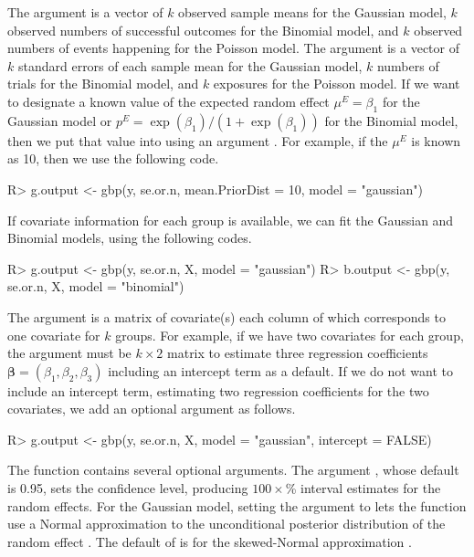 \documentclass[article]{jss}
\begin{document}
The argument  is a vector of $k$ observed sample means  for the Gaussian model, $k$ observed numbers of successful outcomes for the Binomial model, and $k$ observed numbers of events happening for the Poisson model. The argument   is a vector of $k$ standard errors of each sample mean for the Gaussian model, $k$ numbers of trials for the Binomial model, and $k$ exposures for the Poisson model. If we want to designate a known value of the expected random effect $\mu^E=\beta_1$ for the Gaussian model or $p^E=\exp(\beta_1)/(1+\exp(\beta_1))$ for the Binomial model, then we put that value into  using an argument . For example, if the $\mu^E$ is known as 10, then we use the following code. %
\begin{CodeChunk}
\begin{CodeInput}
R> g.output <- gbp(y, se.or.n, mean.PriorDist = 10, model = "gaussian")
\end{CodeInput}
\end{CodeChunk}

If covariate information for each group is available, we can fit the Gaussian and Binomial models, using the following codes.
\begin{CodeChunk}
\begin{CodeInput}
R> g.output <- gbp(y, se.or.n, X, model = "gaussian")
R> b.output <- gbp(y, se.or.n, X, model = "binomial")
\end{CodeInput}
\end{CodeChunk}

The argument  is a matrix of covariate(s) each column of which corresponds to one covariate for $k$ groups. For example, if we have two covariates for each group, the argument  must be $k\times2$ matrix to estimate three regression coefficients $\boldsymbol{\beta}=(\beta_1, \beta_2, \beta_3)$ including an intercept term as a default. If we do not want to include an intercept term, estimating two regression coefficients for the two covariates, we add an optional argument  as follows.
\begin{CodeChunk}
\begin{CodeInput}
R> g.output <- gbp(y, se.or.n, X, model = "gaussian", intercept = FALSE)
\end{CodeInput}
\end{CodeChunk}

The function  contains several optional arguments. The argument , whose default is 0.95, sets the confidence level, producing $100\times$\% interval estimates for the random effects. For the Gaussian model, setting the argument  to  lets the function   use a Normal approximation to the unconditional posterior distribution of the random effect \citep{tang2011}. The default of  is  for the skewed-Normal approximation \citep{kelly2014advances}. 
\end{document}
